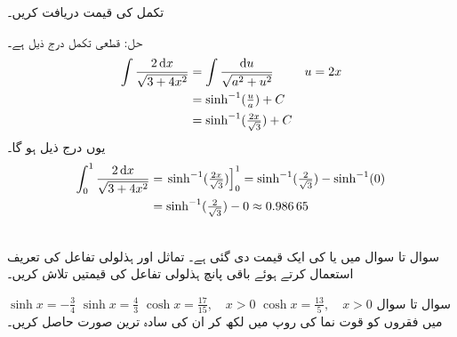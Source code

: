 تکمل  کی قیمت دریافت کریں۔

حل:\quad
قطعی تکمل درج ذیل ہے۔
\begin{align*}
\int\frac{2\dif x}{\sqrt{3+4x^2}}&=\int\frac{\dif u}{\sqrt{a^2+u^2}}&&u=2x\\
&=\sinh^{-1}(\tfrac{u}{a})+C\\
&=\sinh^{-1}(\tfrac{2x}{\sqrt{3}})+C
\end{align*}
یوں درج ذیل ہو گا۔
\begin{align*}
\int_0^1\frac{2\dif x}{\sqrt{3+4x^2}}&=\left.\sinh^{-1}(\tfrac{2x}{\sqrt{3}})\right]_0^1=\sinh^{-1}(\tfrac{2}{\sqrt{3}})-\sinh^{-1}(0)\\
&=\sinh^{-1}(\tfrac{2}{\sqrt{3}})-0\approx \num{0.98665}
\end{align*} 

\\
سوال  تا سوال  میں  یا  کی ایک قیمت دی گئی ہے۔ تماثل  اور ہذلولی تفاعل کی تعریف استعمال کرتے ہوئے باقی پانچ ہذلولی تفاعل کی قیمتیں تلاش کریں۔

$\sinh x=-\tfrac{3}{4}$
$\sinh x=\tfrac{4}{3}$
$\cosh x=\tfrac{17}{15},\quad x>0$
$\cosh x=\tfrac{13}{5},\quad x>0$
سوال  تا سوال  میں فقروں کو قوت نما کی روپ میں لکھ کر ان کی سادہ ترین صورت حاصل کریں۔

